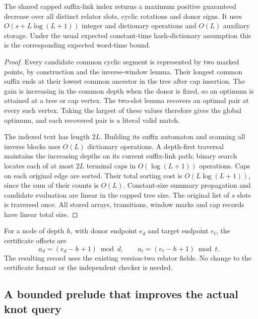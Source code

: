 \begin{theorem}
The shared capped suffix-link index returns a maximum positive guaranteed
decrease over all distinct relator slots, cyclic rotations and donor
signs.  It uses $O(s+L\log(L+1))$ integer and dictionary operations and
$O(L)$ auxiliary storage.  Under the usual expected constant-time
hash-dictionary assumption this is the corresponding expected word-time
bound.
\end{theorem}
\begin{proof}
Every candidate common cyclic segment is represented by two marked points,
by construction and the inverse-window lemma.  Their longest common suffix
ends at their lowest common ancestor in the tree after cap insertion.
The gain is increasing in the common depth when the donor is fixed, so
an optimum is attained at a tree or cap vertex.  The two-slot lemma
recovers an optimal pair at every such vertex.  Taking the largest of
these values therefore gives the global optimum, and each recovered
pair is a literal valid match.

The indexed text has length $2L$.  Building its suffix automaton and
scanning all inverse blocks uses $O(L)$ dictionary operations.  A depth-first
traversal maintains the increasing depths on its current suffix-link path;
binary search locates each of at most $2L$ terminal caps in $O(\log(L+1))$
operations.  Caps on each original edge are sorted.  Their total sorting
cost is $O(L\log(L+1))$, since the sum of their counts is $O(L)$.  Constant-size
summary propagation and candidate evaluation are linear in the capped
tree size.  The original list of $s$ slots is traversed once.  All stored
arrays, transitions, window marks and cap records have linear total size.
\end{proof}

For a node of depth $h$, with donor endpoint $e_d$ and target endpoint
$e_t$, the certificate offsets are
\[
 a_d=(e_d-h+1)\bmod d,\qquad
 a_t=(e_t-h+1)\bmod t.
\]
The resulting record uses the existing version-two relator fields.  No
change to the certificate format or the independent checker is needed.

\subsection{A bounded prelude that improves the actual knot query}

